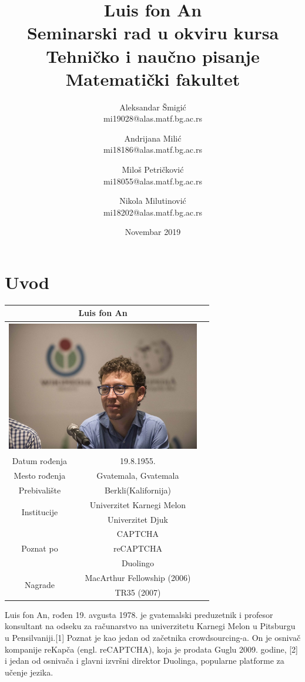 \documentclass[titlepage, 12pt]{article}
\title{Luis fon An\\ \small{Seminarski rad u okviru kursa\\Tehničko i naučno pisanje\\ Matematički fakultet}}
\author{Aleksandar Šmigić \\ mi19028@alas.matf.bg.ac.rs \and Andrijana Milić \\ mi18186@alas.matf.bg.ac.rs \and Miloš Petričković \\ mi18055@alas.matf.bg.ac.rs \and Nikola Milutinović \\ mi18202@alas.matf.bg.ac.rs}
\date{Novembar 2019}
\begin{document}
\maketitle

\tableofcontents
\newpage
\section{Uvod}

{\renewcommand{\arraystretch}{1.2}}
\begin{tabular}{|c|c|c|}
\hline
\multicolumn{2}{|c|}{\Large{Luis fon An}}\\[4px]
\hline
\multicolumn{2}{|c|}{\includegraphics[width=320px,height=216px]{Luis_von_Ahn.jpg}}\\

\hline
Datum rođenja & 19.8.1955. \\
\hline
Mesto rođenja & Gvatemala, Gvatemala\\
\hline
Prebivalište & Berkli(Kalifornija)\\
\hline
\multirow{2}{*}{Institucije}&Univerzitet Karnegi Melon\\
& Univerzitet Djuk \\
\hline 
\multirow{3}{*}{Poznat po} & CAPTCHA \\
& reCAPTCHA \\ & Duolingo \\
\hline
\multirow{2}{*}{Nagrade} & MacArthur Fellowship (2006) \\
 & TR35 (2007)
\\
\hline
\end{tabular}

\vspace{20px}

Luis fon An, rođen 19. avgusta 1978. je gvatemalski preduzetnik i profesor konsultant na odseku za računarstvo na univerzitetu Karnegi Melon u Pitsburgu u Pensilvaniji.[1] Poznat je kao jedan od začetnika crowdsourcing-a. On je osnivač kompanije reKapča (engl. reCAPTCHA), koja je prodata Guglu 2009. godine, [2] i jedan od osnivača i glavni izvršni direktor Duolinga, popularne platforme za učenje jezika. 
\end{document}
